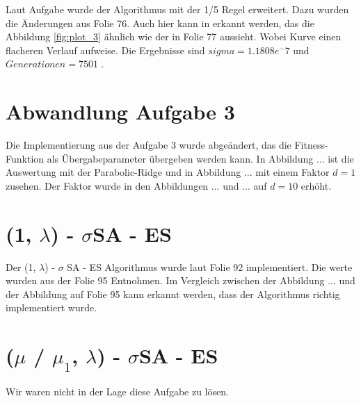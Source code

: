 Laut Aufgabe wurde der Algorithmus mit der 1/5 Regel erweitert. Dazu wurden die Änderungen aus Folie 76. Auch hier kann in erkannt werden, das die Abbildung \ref{fig:plot_3} ähnlich wie der in Folie 77 aussieht. Wobei Kurve einen flacheren Verlauf aufweise. Die Ergebnisse sind $sigma = 1.1808e^-7$ und $Generationen = 7501$ .


\chapter{Abwandlung Aufgabe 3}

Die Implementierung aus der Aufgabe 3 wurde abgeändert, das die Fitness-Funktion als Übergabeparameter übergeben werden kann. In Abbildung  ... ist die Auswertung mit der Parabolic-Ridge und in Abbildung  ... mit einem Faktor $d=1$ zusehen. Der Faktor wurde in den Abbildungen  ... und  ... auf $d=10$ erhöht.



\chapter{(1, $\lambda$) - $\sigma$SA - ES}

Der (1, $\lambda$) - $\sigma$ SA - ES Algorithmus wurde laut Folie 92 implementiert. Die werte wurden aus der Folie 95 Entnohmen. Im Vergleich zwischen der Abbildung  ... und der Abbildung auf Folie 95 kann erkannt werden, dass der Algorithmus richtig implementiert wurde.


\chapter{($\mu$ / $\mu_1$, $\lambda$) - $\sigma$SA - ES}

Wir waren nicht in der Lage diese Aufgabe zu lösen.
